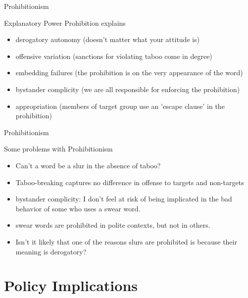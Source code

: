 \documentclass[xcolor=dvipsnames,12pt,handout]{beamer}
\begin{document}
\begin{frame}{Prohibitionism}

\begin{block}{Explanatory Power}
Prohibition explains
\begin{itemize}
\pause
\item derogatory autonomy (doesn't matter what your attitude is)
\pause
\item offensive variation (sanctions for violating taboo come in degree)	
\pause
\item embedding failures (the prohibition is on the very appearance of the word)
\pause
\item bystander complicity (we are all responsible for enforcing the prohibition)
\pause
\item appropriation (members of target group use an 'escape clause' in the prohibition)
\end{itemize}
\end{block}


\end{frame}

\begin{frame}{Prohibitionism}

Some problems with Prohibitionism

\begin{itemize}
\pause
\item Can't a word be a slur in the absence of taboo?
\pause
\item Taboo-breaking captures no difference in offense to targets and non-targets
\pause
\item bystander complicity:  I don't feel at risk of being implicated in the bad behavior of some who uses a swear word.	
\pause
\item swear words are prohibited in polite contexts, but not in others.
\pause
\item Isn't it likely that one of the reasons slurs are prohibited is because their meaning is derogatory?
\end{itemize}

\end{frame}

\section{Policy Implications}
\end{document}
